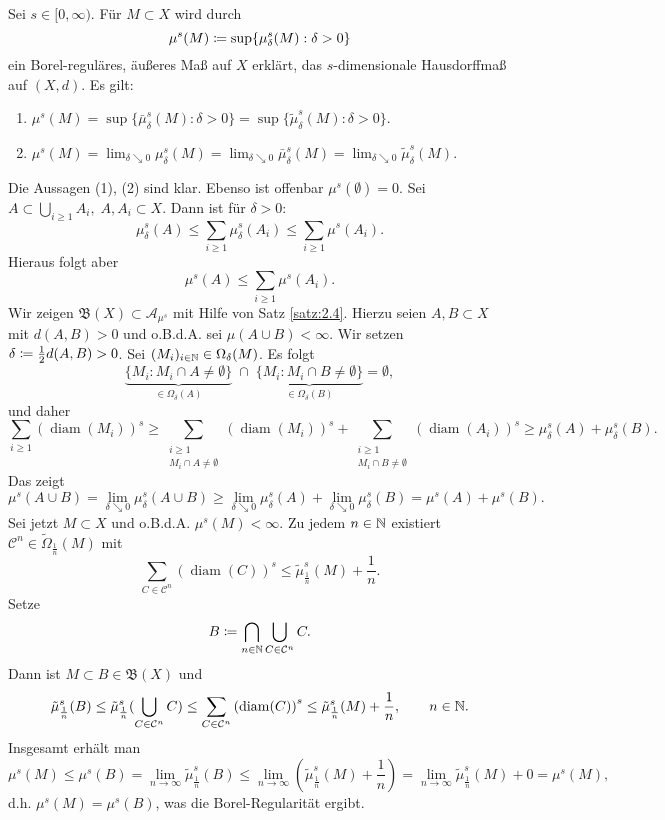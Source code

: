 \documentclass[a4paper,twoside,DIV15,BCOR12mm]{scrbook}
\newcommand{\borel}{\mathfrak B}
\DeclareMathOperator{\diam}{diam}
\begin{document}
\begin{satz}
\label{satz:2.20}

Sei \(s \in [0,\infty)\). Für \(M \subset X\) wird durch
\[
\mu^s(M) \da \sup\{\mu_\delta^s(M) : \delta > 0\}
\]
ein Borel-reguläres, äußeres Maß auf \(X\)  erklärt, das \(s\)-dimensionale Hausdorffmaß auf \((X,d)\). Es gilt:
\begin{enumerate}[(1)]
\item \(\mu^s(M) = \sup\{\bar\mu_\delta^s(M) : \delta > 0\} = \sup\{\tilde\mu_\delta^s(M) : \delta > 0\}\).
\item \(\mu^s(M) = \lim_{\delta \searrow 0} \mu_\delta^s(M) = \lim_{\delta\searrow0} \bar\mu_\delta^s(M) = \lim_{\delta\searrow0} \tilde\mu_\delta^s(M)\).
\end{enumerate}

\end{satz}

\begin{beweis}
Die Aussagen (1), (2) sind klar. Ebenso ist offenbar \(\mu^s(\emptyset) = 0\). Sei \(A \subset \bigcup_{i\geq1} A_i,\;A,A_i\subset X\). Dann ist für \(\delta>0\):
\[
\mu_\delta^s(A) \leq \sum_{i\geq1} \mu_\delta^s(A_i) \leq \sum_{i\geq1} \mu^s(A_i).
\]
Hieraus folgt aber
\[
\mu^s(A) \leq \sum_{i\geq1} \mu^s(A_i).
\]
Wir zeigen \(\borel(X) \subset \mathcal{A}_{\mu^s}\) mit Hilfe von Satz \ref{satz:2.4}. Hierzu seien \(A,B \subset X\) mit $d(A,B)>0$ und o.B.d.A. sei \(\mu(A \cup B) < \infty\). Wir setzen \(\delta \da \frac12 d(A,B) > 0\). Sei \((M_i)_{i\in\mathbb{N}} \in \Omega_\delta(M)\). Es folgt
\[
\underbrace{\{ M_i : M_i \cap A \neq \emptyset \}}_{\in \Omega_\delta(A)}  \; \cap \; \underbrace{\{ M_i : M_i \cap B \neq \emptyset \}}_{\in \Omega_\delta(B)} = \emptyset,
\]
und daher
\[
\sum_{i\geq1} {(\diam(M_i))}^s \geq \sum_{\substack{i\geq1\\ M_i\cap A \neq\emptyset}} {(\diam(M_i))}^s + \sum_{\substack{i\geq1\\ M_i \cap B \neq \emptyset}} {(\diam(A_i))}^s \geq \mu_\delta^s(A) + \mu_\delta^s(B).
\]
Das zeigt
\[
\mu^s(A \cup B) = \lim_{\delta\searrow0}\mu_\delta^s(A\cup B) \geq \lim_{\delta\searrow0}\mu_\delta^s(A) + \lim_{\delta\searrow0}\mu_\delta^s(B) = \mu^s(A)+\mu^s(B).
\]
Sei jetzt \(M \subset X\) und o.B.d.A. \(\mu^s(M)<\infty\). Zu jedem \(n\in\mathbb{N}\) existiert \(\mathcal{C}^n \in \tilde\Omega_{\frac1n}(M)\) mit 
$$
\sum_{C \in \mathcal{C}^n} {(\diam(C))}^s \leq \tilde\mu_{\frac1n}^s(M)+\frac1n.
$$
Setze
\[
B \da \bigcap_{n\in\MdN}\bigcup_{C\in\mathcal{C}^n}C.
\]
Dann ist \(M \subset B \in \borel(X)\) und 
$$
\tilde\mu^s_{\frac1n}(B) \leq \tilde\mu^s_{\frac1n}(\bigcup_{C\in\mathcal C^n}C) \leq \sum_{C\in\mathcal C^n} {(\diam(C))}^s \leq \tilde\mu^s_{\frac1n}(M)+\frac1n,\qquad  n\in\MdN.
$$
Insgesamt erhält man
$$
\mu^s(M) \leq \mu^s(B) = \lim_{n\rightarrow\infty} \tilde\mu^s_{\frac1n}(B) \leq \lim_{n\rightarrow\infty}(\tilde\mu^s_{\frac1n}(M)+\frac1n) = 
\lim_{n\rightarrow\infty} \tilde\mu^s_{\frac1n}(M) + 0 = \mu^s(M),
$$
d.h. \(\mu^s(M) = \mu^s(B)\), was die Borel-Regularität ergibt.
\end{beweis}
\end{document}
